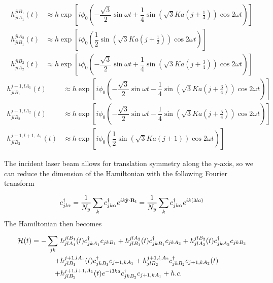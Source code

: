 \begin{align}
  h_{jlA_1}^{jlB_1}(t) &\approx h \exp \left[ i\phi_0 \left(-\dfrac{\sqrt{3}}{2} \sin\omega t + \dfrac{1}{4} \sin(\sqrt{3}Ka(j+\tfrac{1}{4})) \cos 2\omega t \right) \right] \\
  h_{jlB_1}^{jlA_2}(t) &\approx h \exp \left[ i\phi_0 \left(\dfrac{1}{2} \sin(\sqrt{3}Ka(j+\tfrac{1}{2})) \cos 2\omega t \right) \right] \\
  h_{jlA_2}^{jlB_2}(t) &\approx h \exp \left[ i\phi_0 \left(-\dfrac{\sqrt{3}}{2} \sin\omega t + \dfrac{1}{4} \sin(\sqrt{3}Ka(j+\tfrac{3}{4})) \cos 2\omega t \right) \right]
\end{align}
\begin{align}
  h_{jlB_1}^{j+1,lA_1}(t) &\approx h \exp \left[ i\phi_0 \left(-\dfrac{\sqrt{3}}{2} \sin\omega t - \dfrac{1}{4} \sin(\sqrt{3}Ka(j+\tfrac{3}{4})) \cos 2\omega t \right) \right] \\
  h_{jlB_2}^{j+1,lA_2}(t) &\approx h \exp \left[ i\phi_0 \left(-\dfrac{\sqrt{3}}{2}\sin\omega t -\dfrac{1}{4} \sin(\sqrt{3}Ka(j+\tfrac{5}{4})) \cos 2\omega t \right) \right] \\
  h_{jlB_2}^{j+1,l+1,A_1}(t) &\approx h \exp \left[ i\phi_0 \left(\dfrac{1}{2} \sin(\sqrt{3}Ka(j+1)) \cos 2\omega t \right) \right]
\end{align}

The incident laser beam allows for translation symmetry along the y-axis, so we can reduce the dimension of the Hamiltonian with the following Fourier transform

\begin{equation}
  \cc_{jl\alpha} = \dfrac{1}{N_y} \sum_k \cc_{jk\alpha} e^{ik\hat{y}\cdot\vec{R_l}} = \dfrac{1}{N_y} \sum_k \cc_{jk\alpha} e^{ik(3la)}
\end{equation}
The Hamiltonian then becomes

\begin{equation}
\begin{split}
  \mathcal{H} (t) = -\sum_{jk} \ &h_{jlA_1}^{jlB_1}(t) c^{\dagger}_{jkA_1} c_{jkB_1} + h_{jlB_1}^{jlA_2}(t) c^{\dagger}_{jkB_1} c_{jkA_2} + h_{jlA_2}^{jlB_2}(t) c^{\dagger}_{jkA_2} c_{jkB_2} \\
      + &h_{jlB_1}^{j+1,lA_1}(t) c^{\dagger}_{jkB_1} c_{j+1,kA_1} + h_{jlB_2}^{j+1,l,A_2} c^{\dagger}_{jkB_2} c_{j+1,kA_2}(t) \\
      + &h_{jlB_2}^{j+1,l+1,A_1}(t) e^{-i3ka} c^{\dagger}_{jkB_2} c_{j+1,kA_1} + h.c.
\end{split}
\end{equation}

